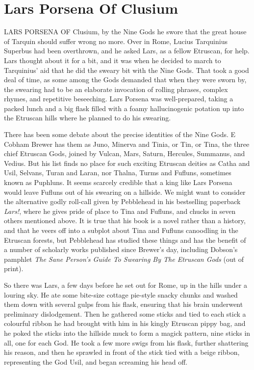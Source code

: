 \chapter{Lars Porsena Of Clusium}

LARS PORSENA OF Clusium, by the Nine Gods he swore that the great house of Tarquin should suffer wrong no more. Over in Rome, Lucius Tarquinius Superbus had been overthrown, and he asked Lars, as a fellow Etruscan, for help. Lars thought about it for a bit, and it was when he decided to march to Tarquinius' aid that he did the sweary bit with the Nine Gods. That took a good deal of time, as some among the Gods demanded that when they were sworn by, the swearing had to be an elaborate invocation of rolling phrases, complex rhymes, and repetitive beseeching. Lars Porsena was well-prepared, taking a packed lunch and a big flask filled with a foamy hallucinogenic potation up into the Etruscan hills where he planned to do his swearing.

There has been some debate about the precise identities of the Nine Gods. E Cobham Brewer has them as Juno, Minerva and Tinia, or Tin, or Tina, the three chief Etruscan Gods, joined by Vulcan, Mars, Saturn, Hercules, Summanus, and Vedius. But his list finds no place for such exciting Etruscan deities as Catha and Usil, Selvans, Turan and Laran, nor Thalna, Turms and Fufluns, sometimes known as Puphluns. It seems scarcely credible that a king like Lars Porsena would leave Fufluns out of his swearing on a hillside. We might want to consider the alternative godly roll-call given by Pebblehead in his bestselling paperback \emph{Lars!}, where he gives pride of place to Tina and Fufluns, and chucks in seven others mentioned above. It is true that his book is a novel rather than a history, and that he veers off into a subplot about Tina and Fufluns canoodling in the Etruscan forests, but Pebblehead has studied these things and has the benefit of a number of scholarly works published since Brewer's day, including Dobson's pamphlet \emph{The Sane Person's Guide To Swearing By The Etruscan Gods} (out of print).

So there was Lars, a few days before he set out for Rome, up in the hills under a louring sky. He ate some bite-size cottage pie-style snacky chunks and washed them down with several gulps from his flask, ensuring that his brain underwent preliminary dislodgement. Then he gathered some sticks and tied to each stick a colourful ribbon he had brought with him in his kingly Etruscan pippy bag, and he poked the sticks into the hillside muck to form a magick pattern, nine sticks in all, one for each God. He took a few more swigs from his flask, further shattering his reason, and then he sprawled in front of the stick tied with a beige ribbon, representing the God Usil, and began screaming his head off.

